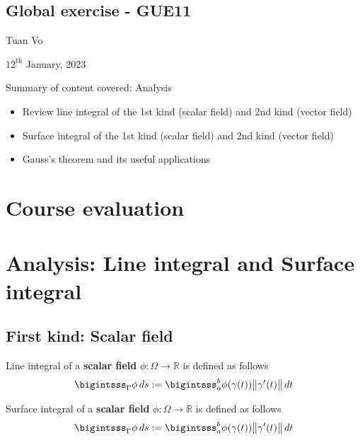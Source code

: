 \documentclass[12pt]{article}
\begin{document}
\begin{center}
	\section*{Global exercise - GUE11}
\end{center}
\begin{center}
	Tuan Vo
\end{center}
\begin{center}
	$12^{\text{th}}$ January, 2023
\end{center}
Summary of content covered: Analysis
\begin{itemize}
	\item Review line integral of the 1st kind (scalar field) and 2nd kind (vector field)
	\item Surface integral of the 1st kind (scalar field) and 2nd kind (vector field)
	\item Gauss's theorem and its useful applications
\end{itemize}
\section{Course evaluation}

\clearpage
\section{Analysis: Line integral and Surface integral}
\subsection{First kind: Scalar field}
\begin{recallboxed}
	\label{recall:scalar}
	Line integral of a 
	\textbf{scalar field} $\phi: \Omega \to \mathbb{R}$ is defined as follows
	\begin{align}
		\bigintsss_{\Gamma} \phi \, ds 
		:= \bigintsss_{a}^{b} \phi(\gamma(t)) \big\| \gamma'(t) \big\| \, dt
	\end{align}
\end{recallboxed}
\begin{recallboxed}
	\label{recall:scalarsurface}
	Surface integral of a 
	\textbf{scalar field} $\phi: \Omega \to \mathbb{R}$ is defined as follows
	\begin{align}
		\bigintsss_{\Gamma} \phi \, ds 
		:= \bigintsss_{a}^{b} \phi(\gamma(t)) \big\| \gamma'(t) \big\| \, dt
	\end{align}
\end{recallboxed}
\end{document}
